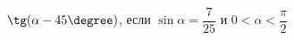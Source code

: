 \begin{ex}[type=simplify_calculate]
	\begin{condition}
		\( \tg(\alpha-45\degree) \), \quad если \( \sin\alpha=\dfrac{7}{25} \) и \( 0<\alpha<\dfrac{\pi}{2}\)
	\end{condition}
\end{ex}